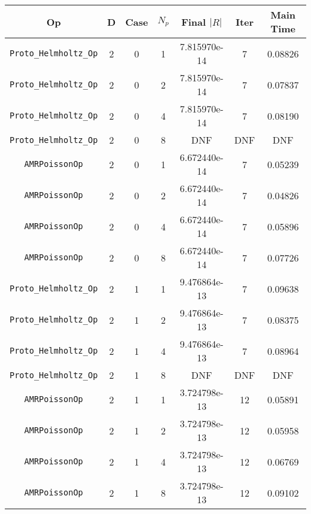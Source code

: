 \documentclass{article}
\begin{document}
\begin{small}
\begin{table}
\begin{center}
\begin{tabular}{|c|c|c|c|c|c||c|} \hline
 Op & D & Case & $N_p$ & Final $|R|$  &  Iter & Main Time \\
\hline
 {\tt Proto\_Helmholtz\_Op} & 2 & 0 &   1    & 7.815970e-14   & 7     & 0.08826   \\
 {\tt Proto\_Helmholtz\_Op} & 2 & 0 &   2    & 7.815970e-14   & 7     & 0.07837   \\
 {\tt Proto\_Helmholtz\_Op} & 2 & 0 &   4    & 7.815970e-14   & 7     & 0.08190   \\
 {\tt Proto\_Helmholtz\_Op} & 2 & 0 &   8    &  DNF  &  DNF    & DNF   \\
\hline                                                                                
 {\tt AMRPoissonOp}         & 2 & 0   & 1    & 6.672440e-14   & 7     &  0.05239   \\
 {\tt AMRPoissonOp}         & 2 & 0   & 2    & 6.672440e-14   & 7     &  0.04826   \\
 {\tt AMRPoissonOp}         & 2 & 0   & 4    & 6.672440e-14   & 7     &  0.05896   \\
 {\tt AMRPoissonOp}         & 2 & 0   & 8    & 6.672440e-14   & 7     &  0.07726   \\
\hline                                                                                     
 {\tt Proto\_Helmholtz\_Op} & 2 & 1   & 1    & 9.476864e-13   &  7    & 0.09638   \\
 {\tt Proto\_Helmholtz\_Op} & 2 & 1   & 2    & 9.476864e-13   &  7    & 0.08375   \\
 {\tt Proto\_Helmholtz\_Op} & 2 & 1   & 4    & 9.476864e-13   &  7    & 0.08964   \\
 {\tt Proto\_Helmholtz\_Op} & 2 & 1   & 8    & DNF   &  DNF    &  DNF  \\
\hline                                                                                
 {\tt AMRPoissonOp}         & 2 & 1   & 1    &  3.724798e-13  &  12    & 0.05891    \\
 {\tt AMRPoissonOp}         & 2 & 1   & 2    &  3.724798e-13  &  12    & 0.05958    \\
 {\tt AMRPoissonOp}         & 2 & 1   & 4    &  3.724798e-13  &  12    & 0.06769    \\
 {\tt AMRPoissonOp}         & 2 & 1   & 8    &  3.724798e-13  &  12    & 0.09102    \\

\end{tabular}
\end{center}
\end{table}
\end{small}
\end{document}
